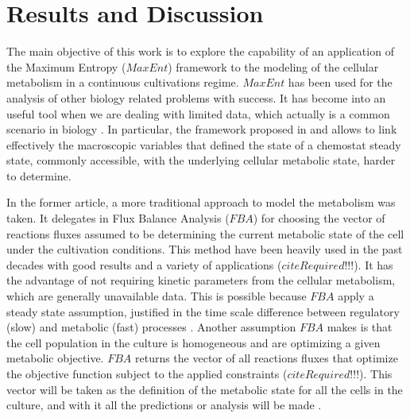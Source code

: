 \section{Results and Discussion} 

	The main objective of this work is to explore the capability of an application of the Maximum Entropy ($MaxEnt$) framework to the modeling of the cellular metabolism in a continuous cultivations regime. $MaxEnt$ has been used for the analysis of other biology related problems with success. It has become into an useful tool when we are dealing with limited data, which actually is a common scenario in biology . In particular, the framework proposed in  and  allows to link effectively the macroscopic variables that defined the state of a chemostat steady state, commonly accessible, with the underlying cellular metabolic state, harder to determine. 
	
	In the former article, a more traditional approach to model the metabolism was taken. It delegates in Flux Balance Analysis ($FBA$)  for choosing the vector of reactions fluxes assumed to be determining the current metabolic state of the cell under the cultivation conditions. This method have been heavily used in the past decades with good results and a variety of applications ($citeRequired!!!$). 
	It has the advantage of not requiring kinetic parameters from the cellular metabolism, which are generally unavailable data.
	This is possible because $FBA$ apply a steady state assumption, justified in the time scale difference between regulatory (slow) and metabolic (fast) processes . 
	Another assumption $FBA$ makes is that the cell population in the culture is homogeneous and are optimizing a given metabolic objective. 
	$FBA$ returns the vector of all reactions fluxes that optimize the objective function subject to the applied constraints ($citeRequired!!!$). 
	This vector will be taken as the definition of the metabolic state for all the cells in the culture, and with it all the predictions or analysis will be made . 
	
